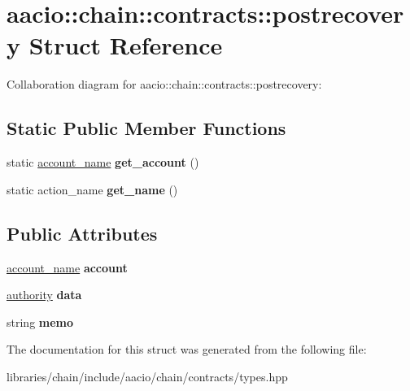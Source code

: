 \hypertarget{structaacio_1_1chain_1_1contracts_1_1postrecovery}{}\section{aacio\+:\+:chain\+:\+:contracts\+:\+:postrecovery Struct Reference}
\label{structaacio_1_1chain_1_1contracts_1_1postrecovery}


Collaboration diagram for aacio\+:\+:chain\+:\+:contracts\+:\+:postrecovery\+:
\subsection*{Static Public Member Functions}
\begin{DoxyCompactItemize}
\item 
\mbox{\label{structaacio_1_1chain_1_1contracts_1_1postrecovery_a59d4b051699a227aafea3243819fce43}} 
static \mbox{\hyperlink{structaacio_1_1chain_1_1name}{account\+\_\+name}} {\bfseries get\+\_\+account} ()
\item 
\mbox{\label{structaacio_1_1chain_1_1contracts_1_1postrecovery_a76676205e4b6362e392f40fc6539715a}} 
static action\+\_\+name {\bfseries get\+\_\+name} ()
\end{DoxyCompactItemize}
\subsection*{Public Attributes}
\begin{DoxyCompactItemize}
\item 
\mbox{\label{structaacio_1_1chain_1_1contracts_1_1postrecovery_a847d845d4fa02084f75e34f0c60eb7e5}} 
\mbox{\hyperlink{structaacio_1_1chain_1_1name}{account\+\_\+name}} {\bfseries account}
\item 
\mbox{\label{structaacio_1_1chain_1_1contracts_1_1postrecovery_aa15ae05ff45787b238aabfc60d3fcf69}} 
\mbox{\hyperlink{structaacio_1_1chain_1_1authority}{authority}} {\bfseries data}
\item 
\mbox{\label{structaacio_1_1chain_1_1contracts_1_1postrecovery_a00f8172cb998a8c17e3a22d38d3151b3}} 
string {\bfseries memo}
\end{DoxyCompactItemize}


The documentation for this struct was generated from the following file\+:\begin{DoxyCompactItemize}
\item 
libraries/chain/include/aacio/chain/contracts/types.\+hpp\end{DoxyCompactItemize}
